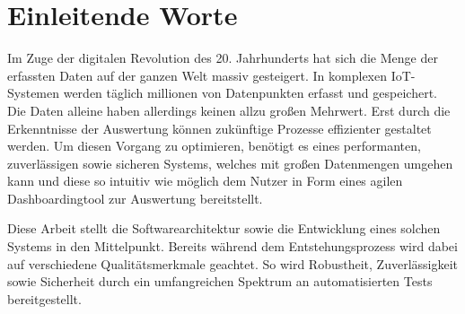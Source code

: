 \chapter*{Einleitende Worte}
\label{chap:einleitende-worte}
Im Zuge der digitalen Revolution des 20. Jahrhunderts hat sich die
Menge der erfassten Daten auf der ganzen Welt massiv gesteigert. In
komplexen IoT-Systemen werden täglich millionen von Datenpunkten
erfasst und gespeichert. Die Daten alleine haben allerdings keinen
allzu großen Mehrwert. Erst durch die Erkenntnisse der Auswertung
können zukünftige Prozesse effizienter gestaltet werden. Um diesen
Vorgang zu optimieren, benötigt es eines performanten, zuverlässigen 
sowie sicheren Systems, welches mit großen Datenmengen umgehen kann
und diese so intuitiv wie möglich dem Nutzer in Form eines agilen
Dashboardingtool zur Auswertung bereitstellt.

Diese Arbeit stellt die Softwarearchitektur sowie die Entwicklung
eines solchen Systems in den Mittelpunkt. Bereits während dem
Entstehungsprozess wird dabei auf verschiedene Qualitätsmerkmale
geachtet. So wird Robustheit, Zuverlässigkeit sowie Sicherheit durch
ein umfangreichen Spektrum an automatisierten Tests bereitgestellt.
